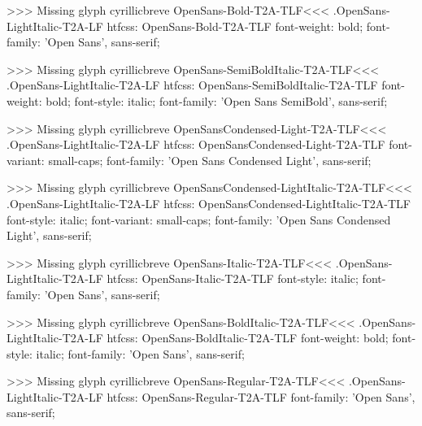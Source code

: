 >>>
Missing glyph	cyrillicbreve
\<OpenSans-Bold-T2A-TLF\><<<
.OpenSans-LightItalic-T2A-LF
htfcss:  OpenSans-Bold-T2A-TLF  font-weight: bold; font-family: 'Open Sans', sans-serif;

>>>
Missing glyph	cyrillicbreve
\<OpenSans-SemiBoldItalic-T2A-TLF\><<<
.OpenSans-LightItalic-T2A-LF
htfcss:  OpenSans-SemiBoldItalic-T2A-TLF  font-weight: bold; font-style: italic; font-family: 'Open Sans SemiBold', sans-serif;

>>>
Missing glyph	cyrillicbreve
\<OpenSansCondensed-Light-T2A-TLF\><<<
.OpenSans-LightItalic-T2A-LF
htfcss:  OpenSansCondensed-Light-T2A-TLF  font-variant: small-caps; font-family: 'Open Sans Condensed Light', sans-serif;

>>>
Missing glyph	cyrillicbreve
\<OpenSansCondensed-LightItalic-T2A-TLF\><<<
.OpenSans-LightItalic-T2A-LF
htfcss:  OpenSansCondensed-LightItalic-T2A-TLF  font-style: italic; font-variant: small-caps; font-family: 'Open Sans Condensed Light', sans-serif;

>>>
Missing glyph	cyrillicbreve
\<OpenSans-Italic-T2A-TLF\><<<
.OpenSans-LightItalic-T2A-LF
htfcss:  OpenSans-Italic-T2A-TLF  font-style: italic; font-family: 'Open Sans', sans-serif;

>>>
Missing glyph	cyrillicbreve
\<OpenSans-BoldItalic-T2A-TLF\><<<
.OpenSans-LightItalic-T2A-LF
htfcss:  OpenSans-BoldItalic-T2A-TLF  font-weight: bold; font-style: italic; font-family: 'Open Sans', sans-serif;

>>>
Missing glyph	cyrillicbreve
\<OpenSans-Regular-T2A-TLF\><<<
.OpenSans-LightItalic-T2A-LF
htfcss:  OpenSans-Regular-T2A-TLF  font-family: 'Open Sans', sans-serif;


